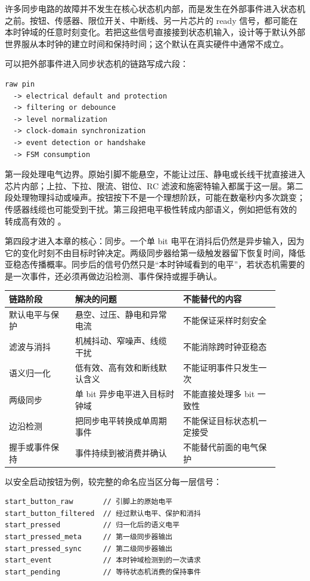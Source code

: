 许多同步电路的故障并不发生在核心状态机内部，而是发生在外部事件进入状态机之前。按钮、传感器、限位开关、中断线、另一片芯片的 ready 信号，都可能在本时钟域的任意时刻变化。若把这些信号直接接到状态机输入，设计等于默认外部世界服从本时钟的建立时间和保持时间；这个默认在真实硬件中通常不成立。

可以把外部事件进入同步状态机的链路写成六段：

\begin{lstlisting}
raw pin
  -> electrical default and protection
  -> filtering or debounce
  -> level normalization
  -> clock-domain synchronization
  -> event detection or handshake
  -> FSM consumption
\end{lstlisting}

第一段处理电气边界。原始引脚不能悬空，不能让过压、静电或长线干扰直接进入芯片内部；上拉、下拉、限流、钳位、RC 滤波和施密特输入都属于这一层。第二段处理物理抖动或噪声。按钮按下不是一个理想阶跃，可能在数毫秒内多次跳变；传感器线缆也可能受到干扰。第三段把电平极性转成内部语义，例如把低有效的  转成高有效的 。

第四段才进入本章的核心：同步。一个单 bit 电平在消抖后仍然是异步输入，因为它的变化时刻不由目标时钟决定。两级同步器给第一级触发器留下恢复时间，降低亚稳态传播概率。同步后的信号仍然只是“本时钟域看到的电平”，若状态机需要的是一次事件，还必须再做边沿检测、事件保持或握手确认。

\begin{longtable}{L{0.22\linewidth}L{0.36\linewidth}L{0.32\linewidth}}
\toprule
链路阶段 & 解决的问题 & 不能替代的内容 \\
\midrule
默认电平与保护 & 悬空、过压、静电和异常电流 & 不能保证采样时刻安全 \\
滤波与消抖 & 机械抖动、窄噪声、线缆干扰 & 不能消除跨时钟亚稳态 \\
语义归一化 & 低有效、高有效和断线默认含义 & 不能证明事件只发生一次 \\
两级同步 & 单 bit 异步电平进入目标时钟域 & 不能直接处理多 bit 一致性 \\
边沿检测 & 把同步电平转换成单周期事件 & 不能保证目标状态机一定接受 \\
握手或事件保持 & 事件持续到被消费并确认 & 不能替代前面的电气保护 \\
\bottomrule
\end{longtable}

以安全启动按钮为例，较完整的命名应当区分每一层信号：

\begin{lstlisting}
start_button_raw       // 引脚上的原始电平
start_button_filtered  // 经过默认电平、保护和消抖
start_pressed          // 归一化后的语义电平
start_pressed_meta     // 第一级同步器输出
start_pressed_sync     // 第二级同步器输出
start_event            // 本时钟域检测到的一次请求
start_pending          // 等待状态机消费的保持事件
\end{lstlisting}

